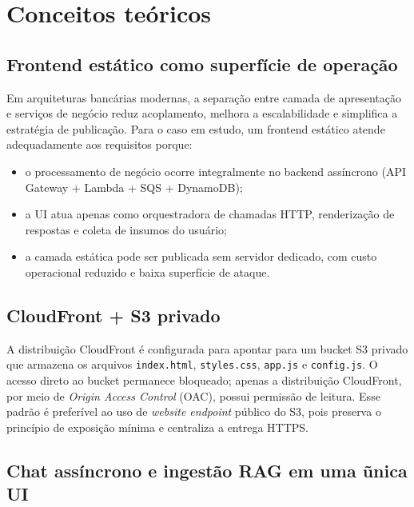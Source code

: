 \section{Conceitos te\'oricos}

\subsection{Frontend est\'atico como superf\'icie de opera\c{c}\~ao}

Em arquiteturas banc\'arias modernas, a separa\c{c}\~ao entre camada de
apresenta\c{c}\~ao e servi\c{c}os de neg\'ocio reduz acoplamento, melhora a
escalabilidade e simplifica a estrat\'egia de publica\c{c}\~ao. Para o caso
em estudo, um frontend est\'atico atende adequadamente aos requisitos
porque:

\begin{itemize}[leftmargin=*]
  \item o processamento de neg\'ocio ocorre integralmente no backend
        ass\'incrono (API Gateway + Lambda + SQS + DynamoDB);
  \item a UI atua apenas como orquestradora de chamadas HTTP,
        renderiza\c{c}\~ao de respostas e coleta de insumos do usu\'ario;
  \item a camada est\'atica pode ser publicada sem servidor dedicado,
        com custo operacional reduzido e baixa superf\'icie de ataque.
\end{itemize}

\subsection{CloudFront + S3 privado}

A distribui\c{c}\~ao CloudFront \'e configurada para apontar para um bucket
S3 privado que armazena os arquivos \texttt{index.html}, \texttt{styles.css},
\texttt{app.js} e \texttt{config.js}. O acesso direto ao bucket permanece
bloqueado; apenas a distribui\c{c}\~ao CloudFront, por meio de
\textit{Origin Access Control} (OAC), possui permiss\~ao de leitura.
Esse padr\~ao \'e prefer\'ivel ao uso de \textit{website endpoint}
p\'ublico do S3, pois preserva o princ\'ipio de exposi\c{c}\~ao m\'inima e
centraliza a entrega HTTPS.

\subsection{Chat ass\'incrono e ingest\~ao RAG em uma \~unica UI}


